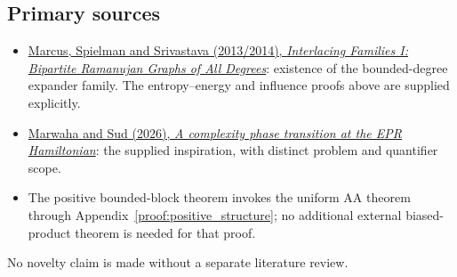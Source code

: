 \subsection{Primary sources}\label{proof:local_interactions:primary-sources}

\begin{itemize}
\tightlist
\item
  \href{https://arxiv.org/abs/1304.4132}{Marcus, Spielman and Srivastava
  (2013/2014), \emph{Interlacing Families I: Bipartite Ramanujan Graphs
  of All Degrees}}: existence of the bounded-degree expander family. The
  entropy--energy and influence proofs above are supplied explicitly.
\item
  \href{https://arxiv.org/abs/2604.13026}{Marwaha and Sud (2026),
  \emph{A complexity phase transition at the EPR Hamiltonian}}: the
  supplied inspiration, with distinct problem and quantifier scope.
\item
  The positive bounded-block theorem invokes the uniform AA theorem
  through Appendix~\ref{proof:positive_structure}; no additional external
  biased-product theorem is needed for that proof.
\end{itemize}

No novelty claim is made without a separate literature review.
